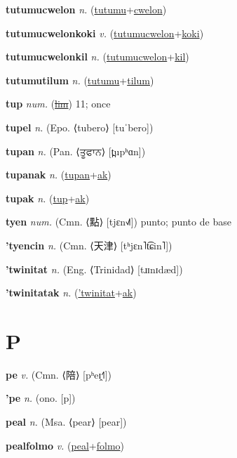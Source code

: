 \textbf{\hypertarget{tutumucwelon}{tutumucwelon}} \textit{n.} (\hyperlink{tutumu}{tutumu}+\allowbreak \hyperlink{cwelon}{cwelon})


\textbf{\hypertarget{tutumucwelonkoki}{tutumucwelonkoki}} \textit{v.} (\hyperlink{tutumucwelon}{tutumucwelon}+\allowbreak \hyperlink{koki}{koki})


\textbf{\hypertarget{tutumucwelonkil}{tutumucwelonkil}} \textit{n.} (\hyperlink{tutumucwelon}{tutumucwelon}+\allowbreak \hyperlink{kil}{kil})


\textbf{\hypertarget{tutumutilum}{tutumutilum}} \textit{n.} (\hyperlink{tutumu}{tutumu}+\allowbreak \hyperlink{tilum}{tilum})


\textbf{\hypertarget{tup}{tup}} \textit{num.} (\hyperlink{lim}{\sout{lim}})
11; once

\textbf{\hypertarget{tupel}{tupel}} \textit{n.} (Epo. ⟨tubero⟩ [tuˈbero])


\textbf{\hypertarget{tupan}{tupan}} \textit{n.} (Pan. ⟨{\gurmukhi{}ਤੂਫਾਨ}⟩ [t̪upʰɑn])


\textbf{\hypertarget{tupanak}{tupanak}} \textit{n.} (\hyperlink{tupan}{tupan}+\allowbreak \hyperlink{ak}{ak})


\textbf{\hypertarget{tupak}{tupak}} \textit{n.} (\hyperlink{tup}{tup}+\allowbreak \hyperlink{ak}{ak})


\textbf{\hypertarget{tyen}{tyen}} \textit{num.} (Cmn. ⟨{\chinese{}點}⟩ [tjɛn˧˩˥])
punto; punto de base

\textbf{\hypertarget{'tyencin}{'tyencin}} \textit{n.} (Cmn. ⟨{\chinese{}天津}⟩ [tʰjɛn˥t͡ɕin˥])


\textbf{\hypertarget{'twinitat}{'twinitat}} \textit{n.} (Eng. ⟨Trinidad⟩ [tɹɪnɪdæd])


\textbf{\hypertarget{'twinitatak}{'twinitatak}} \textit{n.} (\hyperlink{'twinitat}{'twinitat}+\allowbreak \hyperlink{ak}{ak})


\section{P}

\textbf{\hypertarget{pe}{pe}} \textit{v.} (Cmn. ⟨{\chinese{}陪}⟩ [pʰeɪ̯˧˥])


\textbf{\hypertarget{'pe}{'pe}} \textit{n.} (ono. [p])


\textbf{\hypertarget{peal}{peal}} \textit{n.} (Msa. ⟨pear⟩ [pear])


\textbf{\hypertarget{pealfolmo}{pealfolmo}} \textit{v.} (\hyperlink{peal}{peal}+\allowbreak \hyperlink{folmo}{folmo})


